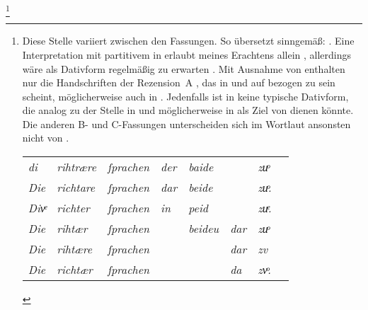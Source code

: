 	\footnote{Diese Stelle variiert zwischen den Fassungen. So übersetzt
		\citeauthor{myers2013} sinngemäß: . Eine Interpretation mit partitivem 
		in   erlaubt meines
		Erachtens allein \citet{kc:A1} \autocite[vgl.][\pno~\textit{zuo
		sprëchen}]{lexer:mhdhwb}, allerdings wäre als Dativform regelmäßig
		 zu erwarten \autocite[182]{ksw2}. Mit Ausnahme von
		\citet{kc:B1} enthalten nur die Handschriften der Rezension~A
		, das in \citet{kc:H} und \citet{kc:B1} auf 
		 bezogen zu sein scheint, möglicherweise auch in
		\citet{kc:W}. Jedenfalls ist  in \citet{kc:B1} keine
		typische Dativform, die analog zu der Stelle in \citet{kc:A1} und
		möglicherweise in \citet{kc:W} als Ziel von  dienen
		könnte. Die anderen B- und C-Fassungen unterscheiden sich im Wortlaut
		ansonsten nicht von \citet{kc:VB}.
		
			\begin{tabular}[t]{
				@{}
				>{\itshape}l @{~}
				>{\itshape}l @{~}
				>{\itshape}l @{~}
				>{\itshape}l @{~}
				>{\itshape}l @{~}
				>{\itshape}l @{~}
				>{\itshape}l
				l
				@{}
			}
			di
				& rihtrære
				& ſprachen
				& der
				& baide
				& %
				& zuͦ
				& \parencite[\pno~44\ra, 29--30]{kc:A1}
				\\

			Die
				& richtare
				& ſprachen
				& dar
				& beide
				& %
				& zuͦ.
				& \parencite[\pno~60\vb, 28]{kc:H}
				\\

			Divͤ
				& richter
				& ſprachen
				& in
				& peid
				& %
				& zuͤ.
				& \parencite[\pno~68\va, 13--14]{kc:W}
				\\

			Die
				& rihtær
				& ſprachen
				& %
				& beideu
				& dar
				& zuͦ
				& \parencites[\pno~28\ra, 8]{kc:B1}
				\\

			Die
				& rihtære
				& ſprachen
				& %
				& %
				& dar
				& zv
				& \parencite[\pno~48\va, 23]{kc:VB}
				\\

			Die
				& richtær
				& ſprachen
				& %
				& %
				& da
				& zvͦ.
				& \parencite[\pno~53\ra, 29]{kc:C1}
				\\


\end{tabular}}
